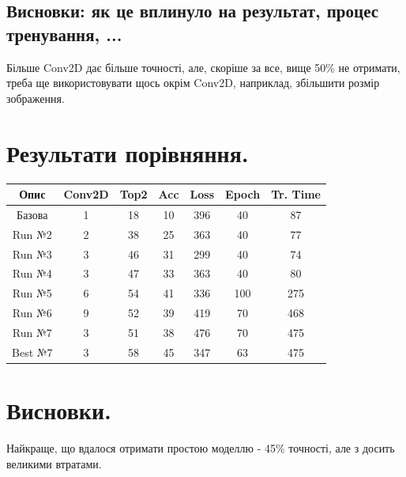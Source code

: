 \documentclass{article}
\begin{document}
    \subsection{Висновки: як це вплинуло на результат, процес тренування, ...}
        Більше Conv2D дає більше точності, але, скоріше за все, вище 50\% не отримати, треба ще використовувати щось окрім Conv2D, наприклад, збільшити розмір зображення.

    \section{Результати порівняння.}
    \begin{table}[h!]
        \centering
        \begin{tabular}{| c | c | c | c | c | c | c |}
            \hline
            Опис & Conv2D & Top2 & Acc & Loss & Epoch & Tr. Time \\
            \hline
            Базова & 1 & 18 & 10 & 396 & 40 & 87 \\
            \hline
            Run №2 & 2 & 38 & 25 & 363 & 40 & 77 \\
            \hline
            Run №3 & 3 & 46 & 31 & 299 & 40 & 74 \\
            \hline
            Run №4 & 3 & 47 & 33 & 363 & 40 & 80 \\
            \hline
            Run №5 & 6 & 54 & 41 & 336 & 100 & 275 \\
            \hline
            Run №6 & 9 & 52 & 39 & 419 & 70 & 468 \\
            \hline
            Run №7 & 3 & 51 & 38 & 476 & 70 & 475 \\
            \hline
            Best №7 & 3 & 58 & 45 & 347 & 63 & 475 \\
            \hline
        \end{tabular}
    \end{table}

    \section{Висновки.}
    Найкраще, що вдалося отримати простою моделлю - 45\% точності, але з досить великими втратами.
\end{document}
